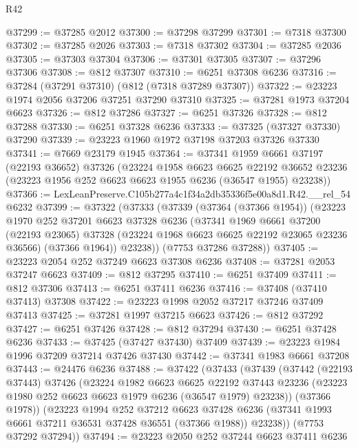 \begin{lexlean}{R42}
\begin{coremodule}
{@37299 := @37285 @2012
@37300 := @37298 @37299
@37301 := @7318 @37300
@37302 := @37285 @2026
@37303 := @7318 @37302
@37304 := @37285 @2036
@37305 := @37303 @37304
@37306 := @37301 @37305
@37307 := @37296 @37306
@37308 := @812 @37307
@37310 := @6251 @37308 @6236
@37316 := @37284 (@37291 @37310) (@812 (@7318 @37289 @37307))
@37322 := @23223 @1974 @2056 @37206 @37251 @37290 @37310
@37325 := @37281 @1973 @37204 @6623
@37326 := @812 @37286
@37327 := @6251 @37326
@37328 := @812 @37288
@37330 := @6251 @37328 @6236
@37333 := @37325 (@37327 @37330) @37290
@37339 := @23223 @1960 @1972 @37198 @37203 @37326 @37330
@37341 := @7669 @23179 @1945
@37364 := @37341
    @1959
    @6661
    @37197
    (@22193 @36652)
    @37326
    (@23224
      @1958
      @6623
      @6625
      @22192
      @36652
      @23236
      (@23223 @1956 @252 @6623 @6623 @1955 @6236 (@36547 @1955) @23238))
@37366 := LexLeanPreserve.C105b277a4c1f34a2db35336f5e00a8d1.R42.__rel_54 @6232
@37399 := @37322
    (@37333
      (@37339
        (@37364 (@37366 @1954))
        (@23223
          @1970
          @252
          @37201
          @6623
          @37328
          @6236
          (@37341
            @1969
            @6661
            @37200
            (@22193 @23065)
            @37328
            (@23224 @1968 @6623 @6625 @22192 @23065 @23236 @36566)
            (@37366 @1964))
          @23238))
      (@7753 @37286 @37288))
@37405 := @23223 @2054 @252 @37249 @6623 @37308 @6236
@37408 := @37281 @2053 @37247 @6623
@37409 := @812 @37295
@37410 := @6251 @37409
@37411 := @812 @37306
@37413 := @6251 @37411 @6236
@37416 := @37408 (@37410 @37413) @37308
@37422 := @23223 @1998 @2052 @37217 @37246 @37409 @37413
@37425 := @37281 @1997 @37215 @6623
@37426 := @812 @37292
@37427 := @6251 @37426
@37428 := @812 @37294
@37430 := @6251 @37428 @6236
@37433 := @37425 (@37427 @37430) @37409
@37439 := @23223 @1984 @1996 @37209 @37214 @37426 @37430
@37442 := @37341 @1983 @6661 @37208
@37443 := @24476 @6236
@37488 := @37422
    (@37433
      (@37439
        (@37442
          (@22193 @37443)
          @37426
          (@23224
            @1982
            @6623
            @6625
            @22192
            @37443
            @23236
            (@23223 @1980 @252 @6623 @6623 @1979 @6236 (@36547 @1979) @23238))
          (@37366 @1978))
        (@23223
          @1994
          @252
          @37212
          @6623
          @37428
          @6236
          (@37341 @1993 @6661 @37211 @36531 @37428 @36551 (@37366 @1988))
          @23238))
      (@7753 @37292 @37294))
@37494 := @23223 @2050 @252 @37244 @6623 @37411 @6236
}
\end{coremodule}
\end{lexlean}
